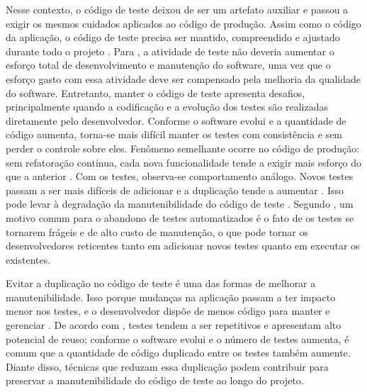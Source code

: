 Nesse contexto, o código de teste deixou de ser um artefato auxiliar e passou a exigir os mesmos cuidados aplicados ao código de produção. Assim como o código da aplicação, o código de teste precisa ser mantido, compreendido e ajustado durante todo o projeto \cite{greiler:etal:2013:b}. Para , a atividade de teste não deveria aumentar o esforço total de desenvolvimento e manutenção do software, uma vez que o esforço gasto com essa atividade deve ser compensado pela melhoria da qualidade do software. Entretanto, manter o código de teste apresenta desafios, principalmente quando a codificação e a evolução dos testes são realizadas diretamente pelo desenvolvedor. Conforme o software evolui e a quantidade de código aumenta, torna-se mais difícil manter os testes com consistência e sem perder o controle sobre eles. Fenômeno semelhante ocorre no código de produção: sem refatoração contínua, cada nova funcionalidade tende a exigir mais esforço do que a anterior \cite{fowler:1999}. Com os testes, observa-se comportamento análogo. Novos testes passam a ser mais difíceis de adicionar e a duplicação tende a aumentar \cite{berner:etal:2005}. Isso pode levar à degradação da manutenibilidade do código de teste \cite{greiler:etal:2013:a}. Segundo , um motivo comum para o abandono de testes automatizados é o fato de os testes se tornarem frágeis e de alto custo de manutenção, o que pode tornar os desenvolvedores reticentes tanto em adicionar novos testes quanto em executar os existentes.

Evitar a duplicação no código de teste é uma das formas de melhorar a manutenibilidade. Isso porque mudanças na aplicação passam a ter impacto menor nos testes, e o desenvolvedor dispõe de menos código para manter e gerenciar \cite{berner:etal:2005,greiler:etal:2013:a}. De acordo com , testes tendem a ser repetitivos e apresentam alto potencial de reuso; conforme o software evolui e o número de testes aumenta, é comum que a quantidade de código duplicado entre os testes também aumente. Diante disso, técnicas que reduzam essa duplicação podem contribuir para preservar a manutenibilidade do código de teste ao longo do projeto.
